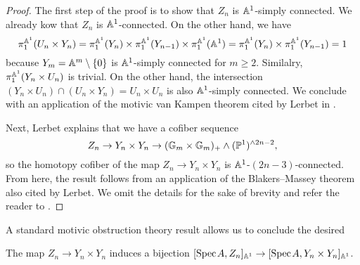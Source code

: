 \begin{proof}
    The first step of the proof is to show that $Z_n$ is $\mathbb{A}^1$-simply connected. We already kow that $Z_n$ is $\mathbb{A}^1$-connected. On the other hand, we have \[\pi_1^{\mathbb{A}^1}(U_n \times Y_n) = \pi_1^{\mathbb{A}^1}(Y_n) \times \pi_1^{\mathbb{A}^1}(Y_{n-1}) \times \pi_1^{\mathbb{A}^1}(\mathbb{A}^1) = \pi_1^{\mathbb{A}^1}(Y_n) \times \pi_1^{\mathbb{A}^1}(Y_{n-1})= 1\] because $Y_m = \mathbb{A}^m\setminus\{0\}$ is $\mathbb{A}^1$-simply connected for $m \geq 2$. Similalry, $\pi_1^{\mathbb{A}^1}(Y_n \times U_n)$ is trivial. On the other hand, the intersection $(Y_n \times U_n) \cap (U_n \times Y_n) = U_n \times U_n$ is also $\mathbb{A}^1$-simply connected. We conclude with an application of the motivic van Kampen theorem cited by Lerbet in \cite[Lemma 5.6]{Lerbet}. 

    Next, Lerbet explains that we have a cofiber sequence
    \[
    Z_n \to Y_n \times Y_n \to (\mathbb{G}_m \times \mathbb{G}_m)_+ \wedge (\mathbb{P}^1)^{\wedge 2n-2},
    \]
    so the homotopy cofiber of the map $Z_n \to Y_n \times Y_n$ is $\mathbb{A}^1$-$(2n-3)$-connected. From here, the result follows from an application of the Blakers--Massey theorem also cited by Lerbet. We omit the details for the sake of brevity and refer the reader to \cite[Lemma 5.6]{Lerbet}.
\end{proof}

A standard motivic obstruction theory result \cite[Lemma 2.22]{Lerbet} allows us to conclude the desired

\begin{corollary}\label{cor:easy}
    The map $Z_n \to Y_n \times Y_n$ induces a bijection $[\text{Spec}\hspace{0.1em} A, Z_n]_{\mathbb{A}^1} \to [\text{Spec}\hspace{0.1em} A, Y_n \times Y_n]_{\mathbb{A}^1}$.
\end{corollary}

